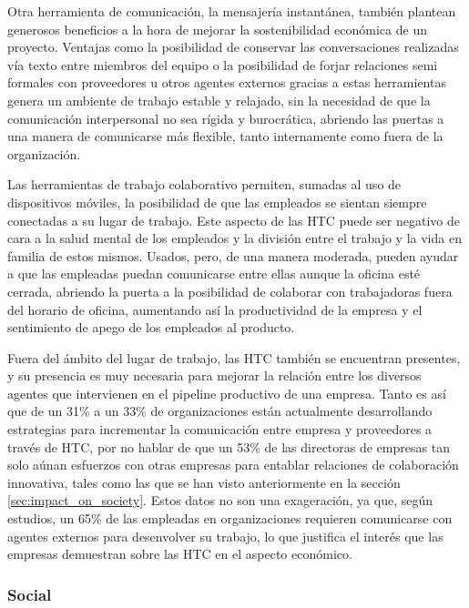 Otra herramienta de comunicación, la mensajería instantánea, también plantean generosos beneficios a la hora de mejorar la sostenibilidad económica de un proyecto. Ventajas como la posibilidad de conservar las conversaciones realizadas vía texto entre miembros del equipo o la posibilidad de forjar relaciones semi formales con proveedores u otros agentes externos gracias a estas herramientas genera un ambiente de trabajo estable y relajado, sin la necesidad de que la comunicación interpersonal no sea rígida y burocrática, abriendo las puertas a una manera de comunicarse más flexible, tanto internamente como fuera de la organización.

Las herramientas de trabajo colaborativo permiten, sumadas al uso de dispositivos móviles, la posibilidad de que las empleados se sientan siempre conectadas a su lugar de trabajo. Este aspecto de las HTC puede ser negativo de cara a la salud mental de los empleados y la división entre el trabajo y la vida en familia de estos mismos. Usados, pero, de una manera moderada, pueden ayudar a que las empleadas puedan comunicarse entre ellas aunque la oficina esté cerrada, abriendo la puerta a la posibilidad de colaborar con trabajadoras fuera del horario de oficina, aumentando así la productividad de la empresa y el sentimiento de apego de los empleados al producto.

Fuera del ámbito del lugar de trabajo, las HTC también se encuentran presentes, y su presencia es muy necesaria para mejorar la relación entre los diversos agentes que intervienen en el pipeline productivo de una empresa. Tanto es así que de un 31\% a un 33\% de organizaciones están actualmente desarrollando estrategias para incrementar la comunicación entre empresa y proveedores a través de HTC\cite{forrester}, por no hablar de que un 53\%\cite{ibm} de las directoras de empresas tan solo aúnan esfuerzos con otras empresas para entablar relaciones de colaboración innovativa, tales como las que se han visto anteriormente en la sección \ref{sec:impact_on_society}. Estos datos no son una exageración, ya que, según estudios, un 65\%\cite{ceb} de las empleadas en organizaciones requieren comunicarse con agentes externos para desenvolver su trabajo, lo que justifica el interés que las empresas demuestran sobre las HTC en el aspecto económico.

\subsubsection{Social}

